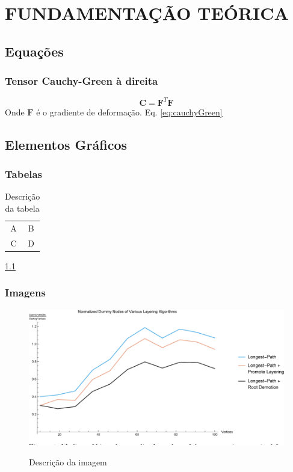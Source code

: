 \chapter{FUNDAMENTAÇÃO TEÓRICA}

\section{Equações}
\subsection{Tensor Cauchy-Green à direita}
\begin{equation}
    \mathbf{C}=\mathbf{F}^T \mathbf{F}
    \label{eq:cauchyGreen}
\end{equation}
Onde $\mathbf{F}$ é o gradiente de deformação.
Eq. \eqref{eq:cauchyGreen}

\section{Elementos Gráficos}
\subsection{Tabelas}
\begin{table}[H]
    \caption{Descrição da tabela}
    \centering
    \begin{tabular}{c|c}
        A  & B \\
        C & D
    \end{tabular}
    \label{tab:my_label}
\end{table}

\tabela \ref{tab:my_label}

\subsection{Imagens}
\begin{figure}[H]
    \centering
    \caption{Descrição da imagem}
    \includegraphics[width=.5\linewidth]{assets/fig.png}
    \label{fig:my_img}
\end{figure}

